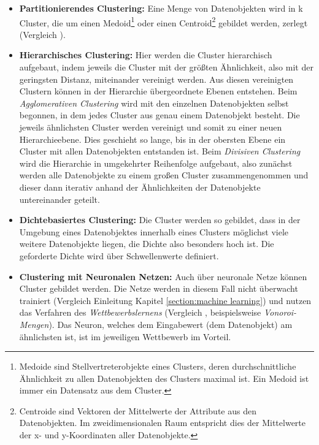 \begin{itemize}
		\item \textbf{Partitionierendes Clustering:} Eine Menge von Datenobjekten wird in k Cluster, die um einen Medoid\footnote{Medoide sind Stellvertreterobjekte eines Clusters, deren durchschnittliche Ähnlichkeit zu allen Datenobjekten des Clusters maximal ist. Ein Medoid ist immer ein Datensatz aus dem Cluster.} oder einen Centroid\footnote{Centroide sind Vektoren der Mittelwerte der Attribute aus den Datenobjekten. Im zweidimensionalen Raum entspricht dies der Mittelwerte der x- und y-Koordinaten aller Datenobjekte.} gebildet werden, zerlegt (Vergleich ). 
		\item \textbf{Hierarchisches Clustering:} Hier werden die Cluster hierarchisch aufgebaut, indem jeweils die Cluster mit der größten Ähnlichkeit, also mit der geringsten Distanz, miteinander vereinigt werden. Aus diesen vereinigten Clustern können in der Hierarchie übergeordnete Ebenen entstehen. Beim \textit{Agglomerativen Clustering} wird mit den einzelnen Datenobjekten selbst begonnen, in dem jedes Cluster aus genau einem Datenobjekt besteht. Die jeweils ähnlichsten Cluster werden vereinigt und somit zu einer neuen Hierarchieebene. Dies geschieht so lange, bis in der obersten Ebene ein Cluster mit allen Datenobjekten entstanden ist. Beim \textit{Divisiven Clustering} wird die Hierarchie in umgekehrter Reihenfolge aufgebaut, also zunächst werden alle Datenobjekte zu einem großen Cluster zusammengenommen und dieser dann iterativ anhand der  Ähnlichkeiten der Datenobjekte untereinander geteilt.  
		\item \textbf{Dichtebasiertes Clustering:} Die Cluster werden so gebildet, dass in der Umgebung eines Datenobjektes innerhalb eines Clusters möglichst viele weitere Datenobjekte liegen, die Dichte also besonders hoch ist. Die geforderte Dichte wird über Schwellenwerte definiert. 
		\item \textbf{Clustering mit Neuronalen Netzen:} Auch über neuronale Netze können Cluster gebildet werden. Die Netze werden in diesem Fall nicht überwacht trainiert (Vergleich Einleitung Kapitel \ref{section:machine learning}) und nutzen das Verfahren des \textit{Wettbewerbslernens} (Vergleich , beispielsweise \textit{Vonoroi-Mengen}). Das Neuron, welches dem Eingabewert (dem Datenobjekt) am ähnlichsten ist, ist im jeweiligen Wettbewerb im Vorteil. 
\end{itemize}	

\newpage

